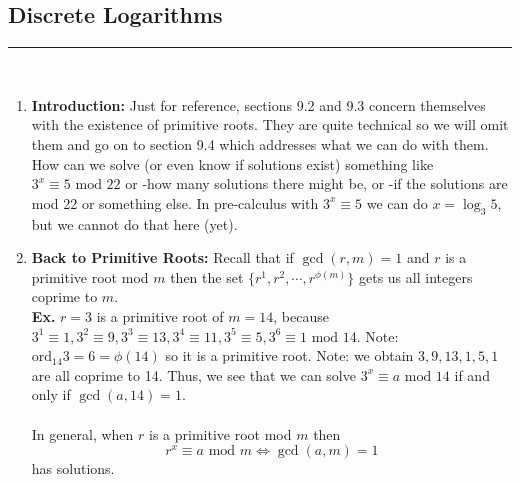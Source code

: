 \documentclass[class=article, crop=false]{standalone}
\begin{document}
\subsection{Discrete Logarithms}
\rule{\textwidth}{1pt}\\
\begin{enumerate}[1.]
\item \textbf{Introduction:} Just for reference, sections 9.2 and 9.3 concern themselves with the
existence of primitive roots. They are quite technical so we will omit them and go on to section 9.4
which addresses what we can do with them. How can we solve (or even know if solutions exist) something like 
$3^x \equiv 5\mbox{ mod }22$
or -how many solutions there might be, or -if the solutions are mod 22 or something else.
In pre-calculus with $3^x \equiv 5$ we can do $x=\log_3 5$, but we cannot do that here (yet).


\item \textbf{Back to Primitive Roots:} Recall that if $\gcd(r,m)=1$ and $r$ is a 
primitive root mod $m$ then the set $\{r^1, r^2, \cdots, r^{\phi(m)}\}$ gets us all integers coprime to $m$.\\
\textbf{Ex.} $r=3$ is a primitive root of $m=14$, because 
$3^1\equiv1, 3^2\equiv 9, 3^3\equiv 13, 3^4\equiv 11, 3^5\equiv 5, 3^6\equiv 1\mbox{ mod }14$.
Note: $\mbox{ord}_{14} 3=6=\phi(14)$ so it is a primitive root. Note: we obtain
$3,9,13,1,5,1$ are all coprime to 14. Thus, we see that we can solve $3^x \equiv a\mbox{ mod }14$ if and only if
$\gcd(a,14)=1$. \\\\
In general, when $r$ is a primitive root mod $m$ then $$r^x \equiv a\mbox{ mod }m \iff \gcd(a,m)=1$$ has solutions.


\end{enumerate}
\end{document}
